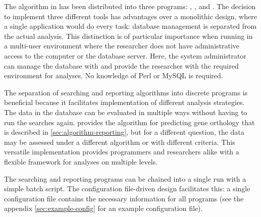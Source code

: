 The algorithm in \pname has been distributed into three programs:
, , and
. The decision to implement three different tools
has advantages over a monolithic design, where a single application would do
every task: database management is separated from the actual analysis. This
distinction is of particular importance when running \pname in a multi-user
environment where the researcher does not have administrative access to the
computer or the database server. Here, the system administrator can manage the
database with  and provide the researcher with the
required environment for analyses. No knowledge of Perl or MySQL is required.

The separation of searching and reporting algorithms into discrete programs is
beneficial because it facilitates implementation of different analysis
strategies. The data in the database can be evaluated in multiple ways without
having to run the searches again.  provides the
algorithm for predicting gene orthology that is described in
\autoref{sec:algorithm-reporting}, but for a different question, the data may be
assessed under a different algorithm or with different criteria. This versatile
implementation provides programmers and researchers alike with a flexible
framework for analyses on multiple levels. 

The searching and reporting programs can be chained into a single run with a
simple batch script. The configuration file-driven design facilitates this: a
single configuration file contains the necessary information for all \pname
programs (see the appendix \autoref{sec:example-config} for an example
configuration file).

